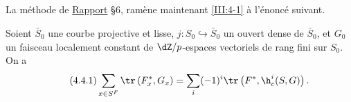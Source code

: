 \subsection{}\label{III:4-4}
La méthode de \hyperref[II]{Rapport} \S 6, ramène maintenant \ref{III:4-1} à l'énoncé suivant.

\begingroup
\renewcommand*{\thesubsection}{4.1bis}
\begin{theorem_}\label{III:4-1bis}
Soient $\bar S_0$ une courbe projective et lisse, 
$j:S_0\hookrightarrow \bar S_0$ un ouvert dense de $\bar S_0$, et $G_0$ un 
faisceau localement constant de $\dZ/p$-espaces vectoriels de rang fini sur 
$S_0$. On a 
\begin{equation*}\tag{4.4.1}\label{III:eq:4-4-1}
  \sum_{x\in S^F} \tr\left(F_x^*,G_x\right) = \sum_i (-1)^i \tr\left(F^*,\h_c^i(S,G)\right) \text{.}
\end{equation*}
\end{theorem_}
\endgroup

